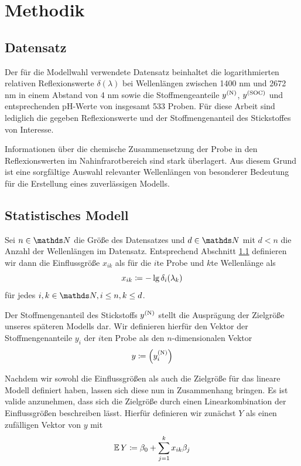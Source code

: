 \section{Methodik}
\label{sec:Methodik}

	\subsection{Datensatz}
	\label{ssec:Datensatz}

	    Der für die Modellwahl verwendete Datensatz beinhaltet die logarithmierten relativen Reflexionswerte $\delta(\lambda)$ bei Wellenlängen zwischen 1400 nm und 2672 nm in einem Abstand von 4 nm sowie die Stoffmengeanteile $y^{\mathrm{(N)}}$, $y^{\mathrm{(SOC)}}$ und entsprechenden pH-Werte von insgesamt 533 Proben.
	    Für diese Arbeit sind lediglich die gegeben Reflexionswerte und der Stoffmengenanteil des Stickstoffes von Interesse.
	    
	    Informationen über die chemische Zusammensetzung der Probe in den Reflexionswerten im Nahinfrarotbereich sind stark überlagert. \cite{Agelet2010}
	    Aus diesem Grund ist eine sorgfältige Auswahl relevanter Wellenlängen von besonderer Bedeutung für die Erstellung eines zuverlässigen Modells.



	\subsection{Statistisches Modell}
	\label{ssec:Statistisches Modell}

	    Sei $n\in\SN$ die Größe des Datensatzes und $d\in\SN$ mit $d< n$ die Anzahl der Wellenlängen im Datensatz.
	    Entsprechend Abschnitt \ref{ssec:Datensatz} definieren wir dann die Einflussgröße $x_{ik}$ als für die $i$te Probe und $k$te Wellenlänge als
	    \[
			x_{ik} \coloneqq -\lg \delta_i(\lambda_k)
		\]
		für jedes $i,k\in\SN,i\leq n,k\leq d$.

	    Der Stoffmengenanteil des Stickstoffs  $y^{\mathrm{(N)}}$ stellt die Ausprägung der Zielgröße unseres späteren Modells dar.
	    Wir definieren hierfür den Vektor der Stoffmengenanteile $y_i$ der $i$ten Probe als den $n$-dimensionalen Vektor
		\[
			 y \coloneqq \left( y^{\mathrm{(N)}}_i \right)
		\]

        Nachdem wir sowohl die Einflussgrößen als auch die Zielgröße für das lineare Modell definiert haben, lassen sich diese nun in Zusammenhang bringen.
        Es ist valide anzunehmen, dass sich die Zielgröße durch einen Linearkombination der Einflussgrößen beschreiben lässt.
        Hierfür definieren wir zunächst $Y$ als einen zufälligen Vektor von $y$ mit
        \[
			 \operatorname{\mathbb{E}} Y \coloneqq \beta_0 + \sum_{j=1}^k{x_{ik}\beta_j}
		\]

